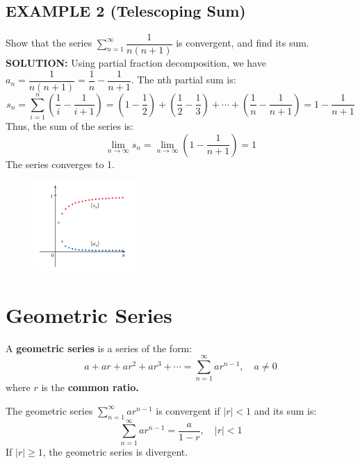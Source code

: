 \documentclass{article}
\theoremstyle{mystyle}
\begin{document}
\subsection*{EXAMPLE 2 (Telescoping Sum)}
Show that the series \( \sum_{n=1}^{\infty} \dfrac{1}{n(n+1)} \) is convergent, and find its sum.\\
\textbf{SOLUTION:}
Using partial fraction decomposition, we have \( a_n = \dfrac{1}{n(n+1)} = \dfrac{1}{n} - \dfrac{1}{n+1} \).
The nth partial sum is:
\[ s_n = \sum_{i=1}^{n} \left(\dfrac{1}{i} - \dfrac{1}{i+1}\right) = \left(1 - \dfrac{1}{2}\right) + \left(\dfrac{1}{2} - \dfrac{1}{3}\right) + \cdots + \left(\dfrac{1}{n} - \dfrac{1}{n+1}\right) = 1 - \dfrac{1}{n+1} \]
Thus, the sum of the series is:
\[ \lim_{n\to\infty} s_n = \lim_{n\to\infty} \left(1 - \dfrac{1}{n+1}\right) = 1 \]
The series converges to 1.
\begin{figure}[htbp]
    \centering
    \includegraphics[width=0.35\textwidth]{graph73.png}
\end{figure}

\section*{Geometric Series}
A \textbf{geometric series} is a series of the form:
\[ a + ar + ar^2 + ar^3 + \cdots = \sum_{n=1}^{\infty} ar^{n-1}, \quad a \neq 0 \]
where \(r\) is the \textbf{common ratio.}

\begin{tcolorbox}[
    colback=white,
    colframe=orange!80!white,
    title=Sum of a Geometric Series,
    boxrule=0.5mm,
    arc=3mm
    ]
    The geometric series \( \sum_{n=1}^{\infty} ar^{n-1} \) is convergent if \(|r|<1\) and its sum is:
    \[ \sum_{n=1}^{\infty} ar^{n-1} = \dfrac{a}{1 - r}, \quad |r| < 1 \]
    If \(|r| \ge 1\), the geometric series is divergent.
\end{tcolorbox}
\end{document}
